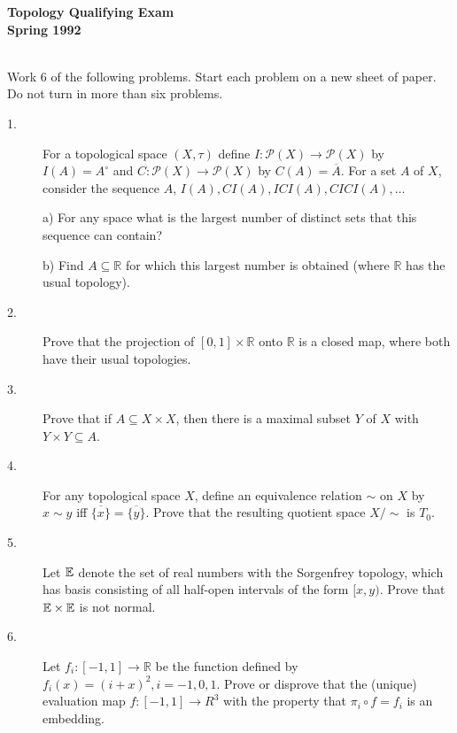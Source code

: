 \documentclass{article}
\def\R{\mathbb R}
\begin{document}






\begin{center}\begin{LARGE}
{\bf Topology Qualifying Exam}\\ 
{\bf Spring 1992}\\ \end{LARGE}
\end{center}
\vspace{0.1in}
\noindent\hrulefill\\
Work 6 of the following problems. Start each problem on a new sheet of
paper. Do not turn in more than six problems.

\begin{description}
\item[1.]
For a topological space $(X, \tau)$ define
$I: {\mathcal P} (X) \to {\mathcal P} (X)$ by $I(A) = A^\circ$ and
$C: {\mathcal P} (X) \to {\mathcal P} (X)$ by
$C(A) = \overline A$. For a set $A$ of $X$, consider the sequence $A$,
$I(A), CI(A), ICI(A), CICI(A), \dots$

\item[\quad] a)
For any space what is the largest number of distinct sets that this sequence
can contain?

\item[\quad] b)
Find $A \subseteq \R$ for which this largest number is obtained (where $\R$
has the usual topology).

\item[2.]
Prove that the projection of  $[0,1] \times \R$ onto $\R$ is a closed map,
where both have their usual topologies.

\item[3.]
Prove that if $A \subseteq X \times X$, then there is a maximal subset $Y$
of $X$ with $Y \times Y \subseteq A$.

\item[4.]
For any topological space $X$, define an equivalence relation $\sim$ on
$X$ by $x \sim y$ iff $\overline{\{x\}} = \overline{\{y\}}$. Prove that
the resulting quotient space $X/ \sim$ is $T_0$.

\item[5.]
Let $\Bbb E$ denote the set of real numbers with the Sorgenfrey topology,
which has basis consisting of all half-open intervals of the form
$[x,y)$. Prove that $\Bbb E \times \Bbb E$ is not normal.

\item[6.]
Let $f_i : [-1,1] \to \R$ be the function defined by
$f_i(x) = (i + x)^2, i = -1, 0, 1$. Prove or disprove that the (unique)
evaluation map $f: [-1,1] \to R^3$ with the property that
$\pi_i \circ f = f_i$ is an embedding.


\end{description}
\end{document}
